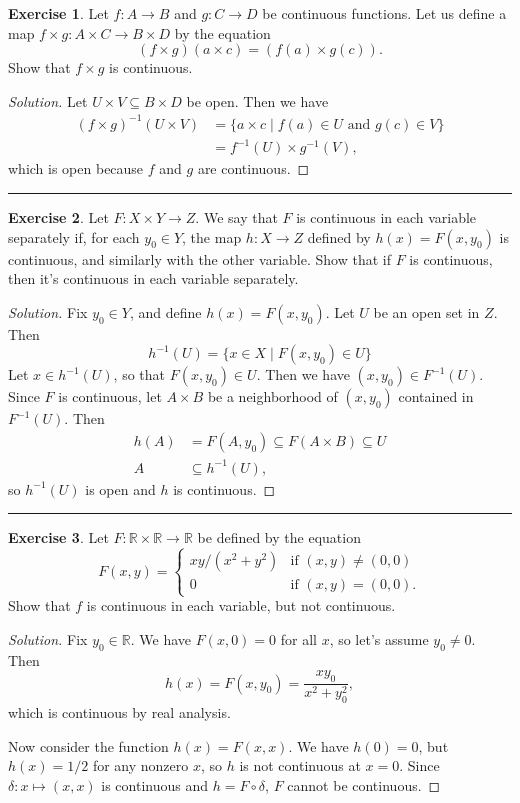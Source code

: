 \documentclass{article}
\theoremstyle{definition}
\newtheorem{exercise}{Exercise}[section]
\begin{document}
\begin{exercise}
  Let $f:A\to B$ and $g:C\to D$ be continuous functions. Let us define a map $f\times g:A\times C\to B\times D$ by the equation
  $$(f\times g)(a\times c) = (f(a)\times g(c)).$$
  Show that $f\times g$ is continuous.
\end{exercise}
\begin{proof}[Solution]
  Let $U\times V\subseteq B\times D$ be open. Then we have
  \begin{align*}
    (f\times g)^{-1}(U\times V) &= \{a\times c\mid f(a)\in U\text{ and }g(c)\in V\} \\
    &= f^{-1}(U)\times g^{-1}(V),
  \end{align*}
  which is open because $f$ and $g$ are continuous.
\end{proof}

\hrule

\begin{exercise}
  Let $F:X\times Y\to Z$. We say that $F$ is continuous in each variable separately if, for each $y_0\in Y$, the map $h:X\to Z$ defined by $h(x) = F(x,y_0)$ is continuous, and similarly with the other variable.
  Show that if $F$ is continuous, then it's continuous in each variable separately.
\end{exercise}
\begin{proof}[Solution]
  Fix $y_0\in Y$, and define $h(x) = F(x,y_0)$. Let $U$ be an open set in $Z$. Then
  $$h^{-1}(U) = \{x\in X\mid F(x,y_0) \in U\}$$
  Let $x\in h^{-1}(U)$, so that $F(x,y_0)\in U$. Then we have $(x,y_0)\in F^{-1}(U)$. Since $F$ is continuous, let $A\times B$ be a neighborhood of $(x,y_0)$ contained in $F^{-1}(U)$. Then
  \begin{align*}
    h(A) &= F(A,y_0)\subseteq F(A\times B)\subseteq U \\
    A &\subseteq h^{-1}(U),
  \end{align*}
  so $h^{-1}(U)$ is open and $h$ is continuous.
\end{proof}

\hrule

\begin{exercise}
  Let $F:\mathbb{R}\times\mathbb{R}\to\mathbb{R}$ be defined by the equation
  $$F(x,y) = \begin{cases}
    xy/(x^2+y^2) & \text{if $(x,y)\ne (0,0)$} \\
    0 & \text{if $(x,y) = (0,0)$}.
  \end{cases}$$
  Show that $f$ is continuous in each variable, but not continuous.
\end{exercise}
\begin{proof}[Solution]
  Fix $y_0\in \mathbb{R}$. We have $F(x,0) = 0$ for all $x$, so let's assume $y_0\ne 0$. Then $$h(x) = F(x,y_0) = \frac{xy_0}{x^2+y_0^2},$$
  which is continuous by real analysis.

  Now consider the function $h(x) = F(x,x)$. We have $h(0) = 0$, but $h(x) = 1/2$ for any nonzero $x$, so $h$ is not continuous at $x=0$. Since $\delta:x\mapsto (x,x)$ is continuous and $h = F\circ\delta$, $F$ cannot be continuous.
\end{proof}
\end{document}

